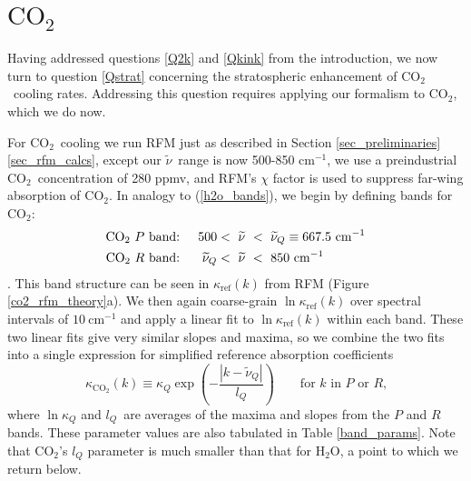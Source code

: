\documentclass{ametsoc}
\newcommand{\beqn}{\begin{equation}}
\newcommand{\eeqn}{\end{equation}}
\newcommand{\beqa}{\begin{eqnarray}}
\newcommand{\eeqa}{\end{eqnarray}}
\newcommand{\eqnref}[1]{(\ref{#1})}
\newcommand{\cminverse}{\ensuremath{\mathrm{cm^{-1}}}}
\newcommand{\ppp}{\ensuremath{\partial_p}}
\newcommand{\cotwo}{\ensuremath{\mathrm{CO_2}}}
\newcommand{\htwo}{\ensuremath{\mathrm{H_2O}}}
\newcommand{\wv}{\ensuremath{\widetilde{\nu}}}
\newcommand{\trans}{\ensuremath{\mathcal{T}}}
\newcommand{\kapparef}{\ensuremath{\kappa_{\mathrm{ref}}}}
\newcommand{\kappaQ}{\ensuremath{\kappa_Q}}
\newcommand{\krot}{\ensuremath{\wv_\mathrm{rot}}}
\newcommand{\kQ}{\ensuremath{\wv_Q}}
\newcommand{\lrot}{\ensuremath{l_\mathrm{rot}}}
\newcommand{\lQ}{\ensuremath{l_{Q}}}
\newcommand{\rot}{\ensuremath{\textbf{rot}}}
\begin{document}
 

 
\section{\cotwo\ } \label{sec_co2}
Having addressed questions \ref{Q2k} and \ref{Qkink} from the introduction,  we now turn to question \ref{Qstrat} concerning the stratospheric enhancement of \cotwo\ cooling rates. Addressing this question requires applying our formalism to \cotwo, which we do now.

For \cotwo\ cooling we run RFM just as described in Section \ref{sec_preliminaries}\ref{sec_rfm_calcs}, except our \wv\ range is now 500-850 \cminverse, we use a preindustrial \cotwo\ concentration of 280 ppmv, and RFM's $\chi$ factor \citep[from ][]{cousin1985} is used to suppress far-wing absorption of \cotwo. In analogy to  \eqnref{h2o_bands}, we begin by defining bands for \cotwo:
\beqa
		\begin{split}
	    		\text{\cotwo\ $P$ band: } && 500 &<\   \wv\ <\  \kQ\equiv 667.5\ \cminverse \\
    			\text{\cotwo\ $R$ band: } & & \kQ &<\   \wv\ < \  850\ \cminverse  \ 
		\end{split}
		\label{co2_bands}
\eeqa
 \citep[here \kQ\ denotes the spectral location of the main \cotwo\ $Q$ branch, which lies between its associated $P$ and $R$ branches, ][]{coakley2014}. This band structure can be seen in $\kapparef(k)$ from RFM (Figure \ref{co2_rfm_theory}a). We then again coarse-grain $\ln \kapparef(k)$ over spectral intervals of $10 \ \cminverse$ and apply a linear fit to $\ln \kapparef(k)$ within each band. These two linear fits give very similar slopes and maxima, so we combine the two fits into a single expression for simplified reference absorption coefficients
  \beqn
 	\kappa_{\cotwo}(k)  \equiv   \kappaQ \exp\left(-\frac{|k-\kQ|}{\lQ}\right) \quad \quad \text{for $k$ in $P$ or $R$,}   			
	\label{kappa_co2}  
\eeqn
 where $\ln \kappaQ$ and  \lQ\ are averages of the maxima and slopes from the $P$ and $R$ bands. These parameter values are also tabulated in Table \ref{band_params}. Note that \cotwo's $\lQ$ parameter is much smaller than that for \htwo, a point to which we return below.
\end{document}
